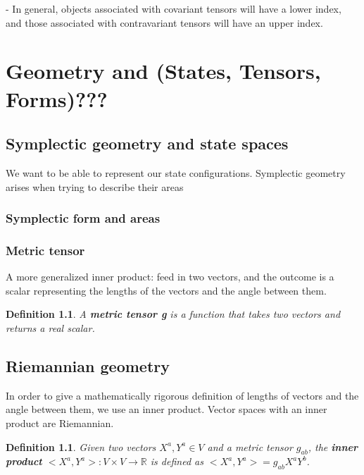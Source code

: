 \documentclass{book}
\newtheorem{defn}[equation]{Definition}
\begin{document}
- In general, objects associated with covariant tensors will have a lower index, and those associated with contravariant tensors will have an upper index. 












\chapter{Geometry and (States, Tensors, Forms)???}


\section{Symplectic geometry and state spaces}
We want to be able to represent our state configurations. Symplectic geometry arises when trying to describe their areas

\subsection{Symplectic form and areas}



\subsection{Metric tensor}
A more generalized inner product: feed in two vectors, and the outcome is a scalar representing the lengths of the vectors and the angle between them. 

\begin{defn}
	A \textbf{metric tensor g} is a function that takes two vectors and returns a real scalar. 
\end{defn}


\section{Riemannian geometry}
In order to give a mathematically rigorous definition of lengths of vectors and the angle between them, we use an inner product. Vector spaces with an inner product are Riemannian.

\begin{defn}
	Given two vectors $X^a,Y^a \in V$ and a metric tensor $g_{ab}$, the \textbf{inner product} $<X^a,Y^a> : V \times V \to \mathbb{R}$ is defined as $<X^a,Y^a> = g_{ab}X^aY^b$. 
\end{defn}
\end{document}
